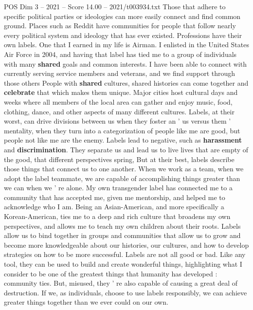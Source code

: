 \begin{textsample}{POS Dim 3 – 2021 – Score 14.00 – 2021/t003934.txt}
Those that adhere to specific political parties or ideologies can more easily connect and find common ground.
Places such as Reddit have communities for people that follow nearly every political system and ideology that has ever existed.
Professions have their own labels.
One that I earned in my life is Airman.
I enlisted in the United States Air Force in 2004, and having that label has tied me to a group of individuals with many \textbf{shared} goals and common interests.
I have been able to connect with currently serving service members and veterans, and we find support through those others People with \textbf{shared} cultures, shared histories can come together and \textbf{celebrate} that which makes them unique.
Major cities host cultural days and weeks where all members of the local area can gather and enjoy music, food, clothing, dance, and other aspects of many different cultures.
Labels, at their worst, can drive divisions between us when they foster an ' us versus them ' mentality, when they turn into a categorization of people like me are good, but people not like me are the enemy.
Labels lead to negative, such as \textbf{harassment} and \textbf{discrimination}.
They separate us and lead us to live lives that are empty of the good, that different perspectives spring, But at their best, labels describe those things that connect us to one another.
When we work as a team, when we adopt the label teammate, we are capable of accomplishing things greater than we can when we ' re alone.
My own transgender label has connected me to a community that has accepted me, given me mentorship, and helped me to acknowledge who I am.
Being an Asian-American, and more specifically a Korean-American, ties me to a deep and rich culture that broadens my own perspectives, and allows me to teach my own children about their roots.
Labels allow us to bind together in groups and communities that allow us to grow and become more knowledgeable about our histories, our cultures, and how to develop strategies on how to be more successful.
Labels are not all good or bad.
Like any tool, they can be used to build and create wonderful things, highlighting what I consider to be one of the greatest things that humanity has developed : community ties.
But, misused, they ' re also capable of causing a great deal of destruction.
If we, as individuals, choose to use labels responsibly, we can achieve greater things together than we ever could on our own.

\end{textsample}
